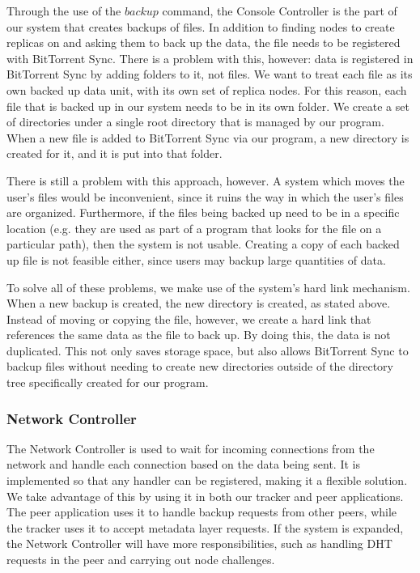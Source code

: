 \documentclass[12pt]{report}
\begin{document}
Through the use of the $backup$ command, the Console Controller is the part of our system that creates backups of files. In addition to finding nodes to create replicas on and asking them to back up the data, the file needs to be registered with BitTorrent Sync. There is a problem with this, however: data is registered in BitTorrent Sync by adding folders to it, not files. We want to treat each file as its own backed up data unit, with its own set of replica nodes. For this reason, each file that is backed up in our system needs to be in its own folder. We create a set of directories under a single root directory that is managed by our program. When a new file is added to BitTorrent Sync via our program, a new directory is created for it, and it is put into that folder.

There is still a problem with this approach, however. A system which moves the user's files would be inconvenient, since it ruins the way in which the user's files are organized. Furthermore, if the files being backed up need to be in a specific location (e.g. they are used as part of a program that looks for the file on a particular path), then the system is not usable. Creating a copy of each backed up file is not feasible either, since users may backup large quantities of data.

To solve all of these problems, we make use of the system's hard link mechanism. When a new backup is created, the new directory is created, as stated above. Instead of moving or copying the file, however, we create a hard link that references the same data as the file to back up. By doing this, the data is not duplicated. This not only saves storage space, but also allows BitTorrent Sync to backup files without needing to create new directories outside of the directory tree specifically created for our program.

\subsubsection{Network Controller} \label{subsubsec:NetworkController_subsec:SystemCore_sec:SystemDesign_chap:Implementation}
The Network Controller is used to wait for incoming connections from the network and handle each connection based on the data being sent. It is implemented so that any handler can be registered, making it a flexible solution. We take advantage of this by using it in both our tracker and peer applications. The peer application uses it to handle backup requests from other peers, while the tracker uses it to accept metadata layer requests. If the system is expanded, the Network Controller will have more responsibilities, such as handling DHT requests in the peer and carrying out node challenges.
\end{document}
